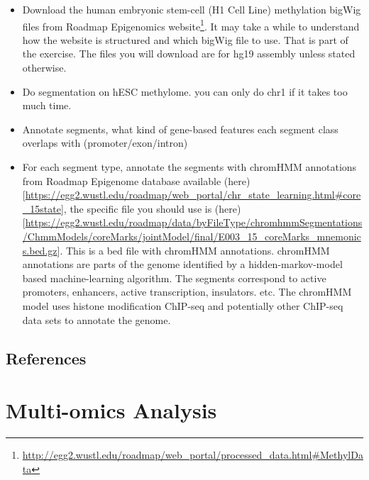 \documentclass[12pt,]{krantz}
\providecommand{\tightlist}{%
  \setlength{\itemsep}{0pt}\setlength{\parskip}{0pt}}
\renewcommand{\href}[2]{#2\footnote{\url{#1}}}
\begin{document}
\begin{itemize}
\tightlist
\item
  Download the human embryonic stem-cell (H1 Cell Line) methylation bigWig files from \href{http://egg2.wustl.edu/roadmap/web_portal/processed_data.html\#MethylData}{Roadmap Epigenomics website}. It may take a while to understand how the website is structured and which bigWig file to use. That is part of the exercise. The files you will download are for hg19 assembly unless stated otherwise.
\item
  Do segmentation on hESC methylome. you can only do chr1 if it takes too much time.
\item
  Annotate segments, what kind of gene-based features each segment class overlaps with (promoter/exon/intron)
\item
  For each segment type, annotate the segments with chromHMM annotations from Roadmap Epigenome database available (here){[}\url{https://egg2.wustl.edu/roadmap/web_portal/chr_state_learning.html\#core_15state}{]}, the specific file you should use is (here){[}\url{https://egg2.wustl.edu/roadmap/data/byFileType/chromhmmSegmentations/ChmmModels/coreMarks/jointModel/final/E003_15_coreMarks_mnemonics.bed.gz}{]}. This is a bed file with chromHMM annotations. chromHMM annotations are parts of the genome identified by a hidden-markov-model based machine-learning algorithm. The segments correspond to active promoters, enhancers, active transcription, insulators. etc. The chromHMM model uses histone modification ChIP-seq and potentially other ChIP-seq data sets to annotate the genome.
\end{itemize}

\hypertarget{references}{%
\section{References}\label{references}}

\hypertarget{multiomics}{%
\chapter{Multi-omics Analysis}\label{multiomics}}
\end{document}
